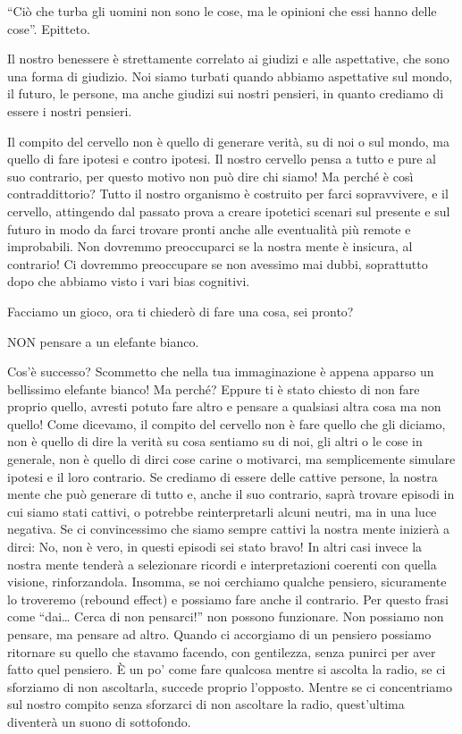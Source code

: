 \documentclass[12pt]{book} %
\begin{document}
“Ciò che turba gli uomini non sono le cose, ma le opinioni che essi hanno delle cose”. Epitteto.

Il nostro benessere è strettamente correlato ai giudizi e alle aspettative, che sono una forma di giudizio. Noi siamo
turbati quando abbiamo aspettative sul mondo, il futuro, le persone, ma anche giudizi sui nostri pensieri, in quanto
crediamo di essere i nostri pensieri.

Il compito del cervello non è quello di generare verità, su di noi o sul mondo, ma quello di fare ipotesi e contro
ipotesi. Il nostro cervello pensa a tutto e pure al suo contrario, per questo motivo non può dire chi siamo! Ma perché
è così contraddittorio? Tutto il nostro organismo è costruito per farci sopravvivere, e il cervello, attingendo dal
passato prova a creare ipotetici scenari sul presente e sul futuro in modo da farci trovare pronti anche alle
eventualità più remote e improbabili. Non dovremmo preoccuparci se la nostra mente è insicura, al contrario! Ci
dovremmo preoccupare se non avessimo mai dubbi, soprattutto dopo che abbiamo visto i vari bias cognitivi. 

Facciamo un gioco, ora ti chiederò di fare una cosa, sei pronto?

NON pensare a un elefante bianco. 

Cos'è successo? Scommetto che nella tua immaginazione è appena apparso un bellissimo elefante
bianco! Ma perché? Eppure ti è stato chiesto di non fare proprio quello, avresti potuto fare altro e pensare a
qualsiasi altra cosa ma non quello! Come dicevamo, il compito del cervello non è fare quello che gli diciamo, non è
quello di dire la verità su cosa sentiamo su di noi, gli altri o le cose in generale, non è quello di dirci cose carine
o motivarci, ma semplicemente simulare ipotesi e il loro contrario. Se crediamo di essere delle cattive persone, la
nostra mente che può generare di tutto e, anche il suo contrario, saprà trovare episodi in cui siamo stati cattivi, o
potrebbe reinterpretarli alcuni neutri, ma in una luce negativa. Se ci convincessimo che siamo sempre cattivi la nostra
mente inizierà a dirci: No, non è vero, in questi episodi sei stato bravo! In altri casi invece la nostra mente tenderà a selezionare ricordi e interpretazioni coerenti con quella visione, rinforzandola. Insomma, se noi cerchiamo qualche pensiero,
sicuramente lo troveremo (rebound effect) e possiamo fare anche il contrario. Per questo frasi come “dai… Cerca di
non pensarci!” non possono funzionare. Non possiamo non pensare, ma pensare ad altro. Quando ci accorgiamo di un pensiero
possiamo ritornare su quello che stavamo facendo, con gentilezza, senza punirci per aver fatto quel pensiero. È un
po' come fare qualcosa mentre si ascolta la radio, se ci sforziamo di non ascoltarla, succede
proprio l'opposto. Mentre se ci concentriamo sul nostro compito senza sforzarci di non ascoltare
la radio, quest'ultima diventerà un suono di sottofondo.
\end{document}
